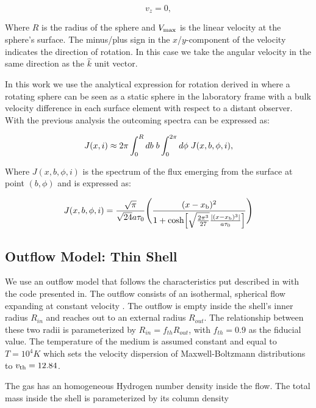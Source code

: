\documentclass{latex/emulateapj}
\begin{document}
\begin{equation}
v_{z}=0, \label{subeq3}
\end{equation}

Where $R$ is the radius of the sphere and $V_{\rm max}$ is the linear velocity at the sphere's surface. The minus/plus sign in the $x$/$y$-component of the velocity indicates the direction of rotation. In this case we take the angular velocity in the same direction as the $\hat{k}$ unit vector.

In this work we use the analytical expression for rotation derived in \citep{Garavito14} where a rotating sphere can be seen as a static sphere in the laboratory frame with a bulk velocity difference in each surface element with respect to a distant observer. With the previous analysis the outcoming spectra can be expressed as:

\begin{equation}
J(x,i) \approx 2\pi \int_0^Rdb \hs b
\int_0^{2\pi}d\phi \hs J(x,b,\phi,i),
\end{equation}

Where $J(x, b, \phi, i)$ is the spectrum of the flux emerging from the surface at point $(b, \phi)$ and is expressed as: 

\begin{equation}
J(x,b,\phi,i)=\frac{\sqrt{\pi}}{\sqrt{24}a\tau_0}\Bigg{(}\frac{(x-x_{\rm
    b})^2}{1+{\rm cosh}\Big{[}\sqrt{\frac{2\pi^3}{27}}\frac{|(x-x_{\rm
        b})^3|}{a\tau_0}\Big{]}}\Bigg{)} 
\end{equation}


\subsection{Outflow Model: Thin Shell}

We use an outflow model that follows the characteristics put described in \citep{Verhamme06} with the code presented in\citep{Orsi12}.  The outflow consists of an isothermal, spherical flow expanding at
constant velocity \vel.  The outflow is empty inside the shell's inner radius $R_{in}$ and
reaches out to an external radius $R_{out}$. The relationship between these two radii is parameterized by $R_{in} =
f_{th}R_{out}$, with $f_{th}=0.9$ as the fiducial value. The temperature of the medium is assumed constant and equal to $T=10^4 K$ which sets the velocity dispersion of Maxwell-Boltzmann distributions to $v_{\rm th}=12.84$\kms. 

The gas has an homogeneous Hydrogen number density inside the flow. The total mass inside the shell is parameterized by its column density
\end{document}
